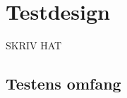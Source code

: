 \chapter{Testdesign}
\label{ParametreTestdesign}
%
SKRIV HAT
%
\section{Testens omfang}
\label{ParametreTestensOmfangValgAfGestikker}
%